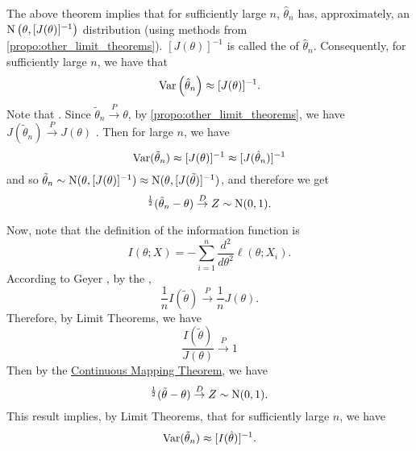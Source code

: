 \documentclass[notoc,notitlepage]{tufte-book}
\newcommand{\convd}{\overset{D}{\to}}
\newcommand{\convp}{\overset{P}{\to}}
\begin{document}
\begin{note}
  The above theorem implies that for sufficiently large $n$, $\hat{\theta}_n$ has, approximately, an $\operatorname{N}\left(\theta, [J(\theta)]^{-1}\right)$ distribution (using methods from \\ \noindent\cref{propo:other_limit_theorems}). $[J(\theta)]^{-1}$ is called the  of $\hat{\theta}_n$. Consequently, for sufficiently large $n$, we have that
  \begin{equation*}
    \operatorname{Var}\left(\hat{\theta}_n\right) \approx [ J(\theta) ]^{-1}.
  \end{equation*}
  Note that . Since $\tilde{\theta}_n \convp \theta$, by \cref{propo:other_limit_theorems}, we have $J(\tilde{\theta}_n) \convp J(\theta)$ . Then for large $n$, we have
  \begin{equation*}
    \operatorname{Var}(\tilde{\theta}_n) \approx [ J(\theta) ]^{-1} \approx [ J(\hat{\theta}_n) ]^{-1}
  \end{equation*}
  and so $\tilde{\theta}_n \sim \operatorname{N}( \theta, [ J(\theta) ]^{-1} ) \approx \operatorname{N}( \theta, [J(\tilde{\theta})]^{-1} )$, and therefore we get
  \begin{equation*}
    [J(\tilde{\theta}_n)]^{\frac{1}{2}} (\tilde{\theta}_n - \theta) \convd Z \sim \Nor(0, 1).
  \end{equation*}

  Now, note that the definition of the information function is
  \begin{equation*}
    I(\theta; X) = - \sum_{i=1}^{n} \frac{d^2}{d\theta^2} \ell(\theta; X_i).
  \end{equation*}
  According to Geyer \cite{Geyer2007}, by the ,
  \begin{equation*}
    \frac{1}{n} I(\tilde{\theta}) \convp \frac{1}{n} J(\theta).
  \end{equation*}
  Therefore, by Limit Theorems, we have
  \begin{equation*}
    \frac{I(\tilde{\theta})}{J(\theta)} \convp 1
  \end{equation*}
  Then by the \hyperref[propo:other_limit_theorems]{Continuous Mapping Theorem}, we have
  \begin{equation*}
    [I(\tilde{\theta})]^{\frac{1}{2}} ( \tilde{\theta} - \theta ) \convd Z \sim \Nor(0, 1).
  \end{equation*}
  This result implies, by Limit Theorems, that for sufficiently large $n$, we have
  \begin{equation*}
    \operatorname{Var}(\tilde{\theta}_n) \approx [ I(\hat{\theta}) ]^{-1}.
  \end{equation*}
\end{note}
\end{document}

